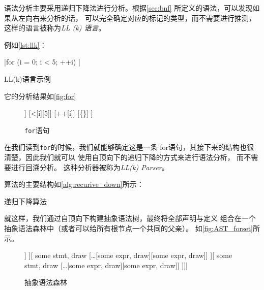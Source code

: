 语法分析主要采用递归下降法进行分析。根据\autoref{sec:bnf}
所定义的语法，可以发现如果从左向右来分析的话，
可以完全确定对应的标记的类型，而不需要进行推测\cite{kernighan2006c}，
这样的语言被称为{\it LL (k) 语言}。

例如\autoref{lst:llk}：

\begin{listing}[hbt]
|for (i = 0; i < 5; ++i) {}|
\caption{LL(k)语言示例}\label{lst:llk}
\end{listing}

它的分析结果如\autoref{fig:for}

\begin{figure}[hbt]
	\centering
	\begin{forest}
		[for,draw
		[{=}[i][0]]
		[<[i][5]]
		[++[i]]
		[{\{\}}]
		]
	\end{forest}
	\caption{{\tt for}语句}\label{fig:for}
\end{figure}

在我们读到{\tt for}的时候，我们就能够确定这是一条
for语句，其接下来的结构也很清楚，因此我们就可以
使用自顶向下的递归下降的方式来进行语法分析\cite{aho1986compilers,kernighan2006c}，
而不需要进行回溯分析。
这种分析器被称为{\it LL(k) Parser}。

算法的主要结构如\autoref{alg:recurive_down}所示：

\begin{algorithm}[hbt]
	\caption{递归下降算法}\label{alg:recurive_down}
	\BlankLine{}
\end{algorithm}

就这样，我们通过自顶向下构建抽象语法树，最终将全部声明与定义
组合在一个抽象语法森林中（或者可以给所有根节点一个共同的父亲）。
如\autoref{fig:AST_forset}所示。

\begin{figure}[hbt]
	\centering
	\begin{forest}
		[
		{some definition},draw[
		\dots[
			{some stmt}, draw
				[\dots[{some expr}, draw][{some expr}, draw]]
		][
			{some stmt}, draw
				[\dots[{some expr}, draw][{some expr}, draw]]
		][
			{some stmt}, draw
				[\dots[{some expr}, draw][{some expr}, draw]]
		]]]
	\end{forest}

	\caption{抽象语法森林}\label{fig:AST_forset}
\end{figure}

